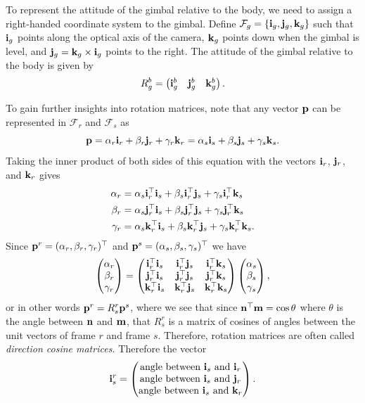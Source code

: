 To represent the attitude of the gimbal relative to the body, we need to assign a right-handed coordinate system to the gimbal.  Define $\mathcal{F}_g = \{\mathbf{i}_g, \mathbf{j}_g, \mathbf{k}_g\}$ such that $\mathbf{i}_g$ points along the optical axis of the camera, $\mathbf{k}_g$ points down when the gimbal is level, and $\mathbf{j}_g = \mathbf{k}_g\times\mathbf{i}_g$ points to the right.  The attitude of the gimbal relative to the body is given by
\[
R_g^b = \begin{pmatrix} \mathbf{i}_g^b & \mathbf{j}_g^b & \mathbf{k}_g^b \end{pmatrix}.
\]

To gain further insights into rotation matrices, note that any vector $\mathbf{p}$ can be represented in $\mathcal{F}_r$ and $\mathcal{F}_s$ as
\[
\mathbf{p} = \alpha_r\mathbf{i}_r + \beta_r\mathbf{j}_r + \gamma_r\mathbf{k}_r = \alpha_s\mathbf{i}_s + \beta_s\mathbf{j}_s + \gamma_s\mathbf{k}_s.
\]
Taking the inner product of both sides of this equation with the vectors $\mathbf{i}_r$, $\mathbf{j}_r$, and $\mathbf{k}_r$ gives
\begin{align*}
\alpha_r &= \alpha_s\mathbf{i}_r^\top \mathbf{i}_s + \beta_s\mathbf{i}_r^\top\mathbf{j}_s + \gamma_s\mathbf{i}_r^\top\mathbf{k}_s \\	
\beta_r &= \alpha_s\mathbf{j}_r^\top \mathbf{i}_s + \beta_s\mathbf{j}_r^\top\mathbf{j}_s + \gamma_s\mathbf{j}_r^\top\mathbf{k}_s \\
\gamma_r &= \alpha_s\mathbf{k}_r^\top \mathbf{i}_s + \beta_s\mathbf{k}_r^\top\mathbf{j}_s + \gamma_s\mathbf{k}_r^\top\mathbf{k}_s.
\end{align*}
Since $\mathbf{p}^r=(\alpha_r, \beta_r, \gamma_r)^\top$ and $\mathbf{p}^s=(\alpha_s, \beta_s, \gamma_s)^\top$ we have 
\[
\begin{pmatrix} \alpha_r \\ \beta_r \\ \gamma_r  \end{pmatrix} = 
\begin{pmatrix}
	\mathbf{i}_r^\top \mathbf{i}_s & \mathbf{i}_r^\top\mathbf{j}_s & \mathbf{i}_r^\top\mathbf{k}_s \\	
    \mathbf{j}_r^\top \mathbf{i}_s & \mathbf{j}_r^\top\mathbf{j}_s & \mathbf{j}_r^\top\mathbf{k}_s \\
    \mathbf{k}_r^\top \mathbf{i}_s & \mathbf{k}_r^\top\mathbf{j}_s & \mathbf{k}_r^\top\mathbf{k}_s
\end{pmatrix}
\begin{pmatrix}
	\alpha_s \\ \beta_s \\ \gamma_s
\end{pmatrix},
\]
or in other words $\mathbf{p}^r = R_s^r \mathbf{p}^s$, where we see that since $\mathbf{n}^\top\mathbf{m}=\cos\theta$ where $\theta$ is the angle between $\mathbf{n}$ and $\mathbf{m}$, that $R_s^r$ is a matrix of cosines of angles between the unit vectors of frame $r$ and frame $s$.  Therefore, rotation matrices are often called {\em direction cosine matrices.}  Therefore the vector
\[
\mathbf{i}_s^r = \begin{pmatrix}
 \text{angle between $\mathbf{i}_s$ and $\mathbf{i}_r$} \\	
 \text{angle between $\mathbf{i}_s$ and $\mathbf{j}_r$} \\	
 \text{angle between $\mathbf{i}_s$ and $\mathbf{k}_r$} \\	
 \end{pmatrix}.
\]

